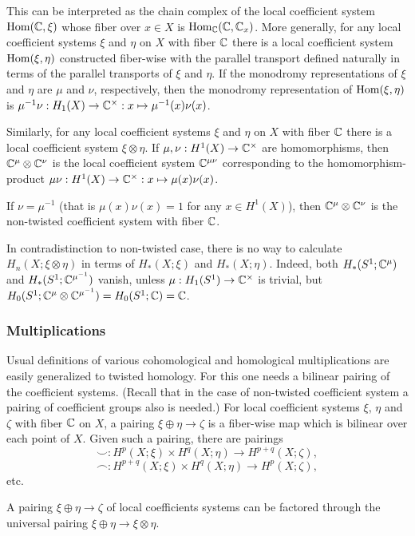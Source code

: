 \documentclass{article}
\numberwithin{equation}{section}
\begin{document}
This can be interpreted as the chain complex of the local coefficient
system $\operatorname{Hom}(\mathbb C,\xi)$ whose fiber over $x\in X$ is $\operatorname{Hom}_\mathbb C(\mathbb C,\mathbb C_x)$. 
More generally, for any local coefficient systems $\xi$ and $\eta$ on $X$ 
with fiber $\mathbb C$ there is a local coefficient system $\operatorname{Hom}(\xi,\eta)$
constructed fiber-wise with the parallel transport defined naturally in terms of
the parallel transports of $\xi$ and $\eta$. If the monodromy
representations of $\xi$ and $\eta$ are $\mu$ and $\nu$, respectively,
then the monodromy representation of $\operatorname{Hom}(\xi,\eta)$ is
$\mu^{-1}\nu:H_1(X)\to\mathbb C^\times:x\mapsto\mu^{-1}(x)\nu(x)$.

Similarly,  for any local coefficient systems $\xi$ and $\eta$ on $X$ 
with fiber $\mathbb C$  there is a local coefficient system $\xi\otimes \eta$.
If $\mu,\nu: H^1(X)\to\mathbb C^\times$ are homomorphisms, then 
$\mathbb C^\mu\otimes\mathbb C^\nu$ is the local coefficient system $\mathbb C^{\mu\nu}$ 
corresponding to the homomorphism-product 
$\mu\nu:H^1(X)\to\mathbb C^\times:x\mapsto \mu(x)\nu(x)$.
                                              
If $\nu=\mu^{-1}$ (that is $\mu(x)\nu(x)=1$ for any $x\in H^1(X)$), 
then $\mathbb C^\mu\otimes\mathbb C^\nu$ is the non-twisted coefficient system 
with fiber $\mathbb C$. 

In contradistinction to non-twisted case, there is no way to calculate 
$H_n(X;\xi\otimes\eta)$ in terms of $H_*(X;\xi)$ and $H_*(X;\eta)$.
Indeed, both $H_*(S^1;\mathbb C^\mu)$ and $H_*(S^1;\mathbb C^{\mu^{-1}})$ vanish, 
unless $\mu:H_1(S^1)\to\mathbb C^\times$ is trivial, but
$H_0(S^1;\mathbb C^\mu\otimes\mathbb C^{\mu^{-1}})=H_0(S^1;\mathbb C)=\mathbb C$. 

\subsubsection{Multiplications}\label{sT.4.2} 
Usual definitions of various cohomological and homological
multiplications are easily generalized to twisted homology. For this one
needs a bilinear pairing of the coefficient systems. (Recall that in the
case of non-twisted coefficient system a pairing of coefficient groups
also is needed.) For local coefficient systems $\xi$, $\eta$ and $\zeta$
with fiber $\mathbb C$ on $X$, a pairing $\xi\oplus\eta\to\zeta$ is a fiber-wise map
which is bilinear over each point of $X$. Given such a pairing, there
are pairings 
$$\smallsmile:H^p(X;\xi)\times H^q(X;\eta)\to H^{p+q}(X;\zeta),$$
 $$\smallfrown:H^{p+q}(X;\xi)\times H^q(X;\eta)\to H^{p}(X;\zeta),$$ 
 etc.

A pairing $\xi\oplus\eta\to\zeta$ of local coefficients systems can be 
factored through the universal pairing $\xi\oplus\eta\to\xi\otimes\eta$.
\end{document}
